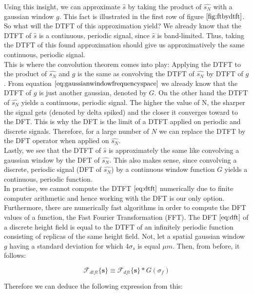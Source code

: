 Using this insight, we can approximate $\hat{s}$ by taking the product of $\hat{s_N}$ with a gaussian window $g$. This fact is illustrated in the first row of figure $\ref{fig:ftbydtft}$. So what will the DTFT of this approximation yield? We already know that the DTFT of $\hat{s}$ is a continuous, periodic signal, since $\hat{s}$ is band-limited. Thus, taking the DTFT of this found approximation should give us approximatively the same continuous, periodic signal. \\

This is where the convolution theorem comes into play: Applying the DTFT to the product of $\hat{s_N}$ and $g$ is the same as convolving the DTFT of $\hat{s_N}$ by DTFT of $g$. From equation $\ref{eq:gaussianwindowfrequencyspace}$ we already know that the DTFT of $g$ is just another gaussian, denoted by $G$. On the other hand the DTFT of $\hat{s_N}$ yields a continuous, periodic signal. The higher the value of N, the sharper the signal gets (denoted by delta spiked) and the closer it converges toward to the DFT. This is why the DFT is the limit of a DTFT applied on periodic and discrete signals. Therefore, for a large number of $N$ we can replace the DTFT by the DFT operator when applied on $\hat{s_N}$. \\

Lastly, we see that the DTFT of $\hat{s}$ is approximately the same like convolving a gaussian window by the DFT of $\hat{s_N}$. This also makes sense, since convolving a discrete, periodic signal (DFT of $\hat{s_N}$) by a continuous window function $G$ yields a continuous, periodic function. \\

In practise, we cannot compute the DTFT $\ref{eq:dtft}$ numerically due to finite computer arithmetic and hence working with the DFT is our only option. Furthermore, there are numerically fast algorithms in order to compute the DFT values of a function, the Fast Fourier Transformation (FFT). The DFT $\ref{eq:dft}$ of a discrete height field is equal to the DTFT of an infinitely periodic function consisting of replicas of the same height field. Not, let a spatial gaussian window $g$ having a standard deviation for which $4\sigma_s$ is equal $\mu m$. Then, from before, it follows:

\begin{equation}
\mathcal{F}_{dtft}\{\mathbf{s}\} \equiv \mathcal{F}_{dft} \{\mathbf{s}\} * G(\sigma_f)
\end{equation} 

Therefore we can deduce the following expression from this:

